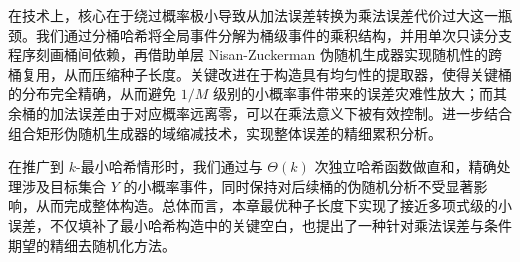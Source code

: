 在技术上，核心在于绕过概率极小导致从加法误差转换为乘法误差代价过大这一瓶颈。我们通过分桶哈希将全局事件分解为桶级事件的乘积结构，并用单次只读分支程序刻画桶间依赖，再借助单层 Nisan-Zuckerman 伪随机生成器实现随机性的跨桶复用，从而压缩种子长度。关键改进在于构造具有均匀性的提取器，使得关键桶的分布完全精确，从而避免 $1/M$ 级别的小概率事件带来的误差灾难性放大；而其余桶的加法误差由于对应概率远离零，可以在乘法意义下被有效控制。进一步结合组合矩形伪随机生成器的域缩减技术，实现整体误差的精细累积分析。

在推广到 $k$-最小哈希情形时，我们通过与 $\Theta(k)$ 次独立哈希函数做直和，精确处理涉及目标集合 $Y$ 的小概率事件，同时保持对后续桶的伪随机分析不受显著影响，从而完成整体构造。总体而言，本章最优种子长度下实现了接近多项式级的小误差，不仅填补了最小哈希构造中的关键空白，也提出了一种针对乘法误差与条件期望的精细去随机化方法。
